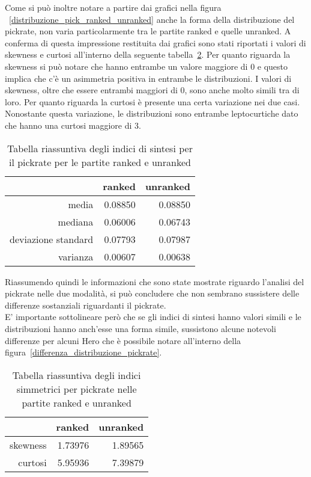 Come si può inoltre notare a partire dai grafici nella figura ~\ref{distribuzione_pick_ranked_unranked} anche la forma della distribuzione del pickrate, non varia particolarmente tra le partite ranked e quelle unranked. A conferma di questa impressione restituita dai grafici sono stati riportati i valori di skewness e curtosi all'interno della seguente tabella~\ref{indici_simmetrici_pickrate}. Per quanto riguarda la skewness si può notare che hanno entrambe un valore maggiore di 0 e questo implica che c'è un asimmetria positiva in entrambe le distribuzioni. I valori di skewness, oltre che essere entrambi maggiori di 0, sono anche molto simili tra di loro. Per quanto riguarda la curtosi è presente una certa variazione nei due casi. Nonostante questa variazione, le distribuzioni sono entrambe leptocurtiche dato che hanno una curtosi maggiore di 3.
\begin{table}
\centering
\caption{Tabella riassuntiva degli indici di sintesi per il pickrate per le partite ranked e unranked}
\label{indici_sintesi_pickrate}
\begin{tabular}{|r|r|r|}
\hline
\multicolumn{1}{|l|}{} & \multicolumn{1}{l|}{ranked} & \multicolumn{1}{l|}{unranked} \\ \hline
media               &  0.08850  &   0.08850 \\ \hline
mediana             &  0.06006  &   0.06743 \\ \hline
deviazione standard &  0.07793  &   0.07987 \\ \hline
varianza            &  0.00607  &   0.00638 \\ \hline
\end{tabular}
\end{table}
Riassumendo quindi le informazioni che sono state mostrate riguardo l'analisi del pickrate nelle due modalità, si può concludere che non sembrano sussistere delle differenze sostanziali riguardanti il pickrate. \\
E' importante sottolineare però che se gli indici di sintesi hanno valori simili e le distribuzioni hanno anch'esse una forma simile, sussistono alcune notevoli differenze per alcuni Hero che è possibile notare all'interno della figura~\ref{differenza_distribuzione_pickrate}.
\begin{table}
\centering
\caption{Tabella riassuntiva degli indici simmetrici per pickrate nelle partite ranked e unranked}
\label{indici_simmetrici_pickrate}
\begin{tabular}{|r|r|r|}
\hline
\multicolumn{1}{|l|}{} & \multicolumn{1}{l|}{ranked} & \multicolumn{1}{l|}{unranked} \\ \hline
skewness    &  1.73976  &   1.89565     \\ \hline
curtosi     &  5.95936  &   7.39879     \\ \hline
\end{tabular}
\end{table}
